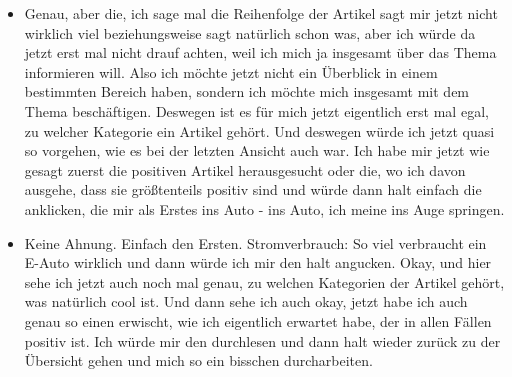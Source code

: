 {\begin{itemize}[]
              So wie ich es jetzt verstehe, dem Markt sind jetzt keine Artikel zugeordnet und hier wäre es jetzt ein bisschen schwierig für mich zu verstehen.
              Ach so, das sind ah, okay, das ist mir eben gerade auch noch nicht klar geworden, diese Zahlen, die geben nicht bestimmte Welten an oder bestimmte Zustände an.
              Also ich habe es so verstanden, dass jetzt die Null beispielsweise der Markt ist und die Eins, dann der nachfolgende Zustand.
              Aber was hier wirklich ausgesagt wird ist die Ebene, die angegeben wird.
              Also eine Ebene darunter wären dann die Artikel \flqq Stromverbrauch so viel verbraucht ein E-Auto wirklich\frqq{} und so weiter.
              Und \flqq Lohnt sich ein E-Auto bei den Strompreisen noch?\frqq{}.
              Die würden dann so wie ich es jetzt verstehe hier am Staat und an diesem unbenannten, an dieser unbenannten Kategorie hängen.
              Und dann zweite Ebene wären halt hier die beiden, also die mit der acht und der sieben und dann dritte Ebene wäre hier unten die letzte Kategorie.
        \item {} Genau, aber die, ich sage mal die Reihenfolge der Artikel sagt mir jetzt nicht wirklich viel beziehungsweise sagt natürlich schon was, aber ich würde da jetzt erst mal nicht drauf achten, weil ich mich ja insgesamt über das Thema informieren will.
              Also ich möchte jetzt nicht ein Überblick in einem bestimmten Bereich haben, sondern ich möchte mich insgesamt mit dem Thema beschäftigen.
              Deswegen ist es für mich jetzt eigentlich erst mal egal, zu welcher Kategorie ein Artikel gehört.
              Und deswegen würde ich jetzt quasi so vorgehen, wie es bei der letzten Ansicht auch war.
              Ich habe mir jetzt wie gesagt zuerst die positiven Artikel herausgesucht oder die, wo ich davon ausgehe, dass sie größtenteils positiv sind und würde dann halt einfach die anklicken, die mir als Erstes ins Auto - ins Auto, ich meine ins Auge springen.
        \item {} Keine Ahnung.
              Einfach den Ersten.
              \flqq Stromverbrauch: So viel verbraucht ein E-Auto wirklich\frqq{} und dann würde ich mir den halt angucken.
              Okay, und hier sehe ich jetzt auch noch mal genau, zu welchen Kategorien der Artikel gehört, was natürlich cool ist.
              Und dann sehe ich auch okay, jetzt habe ich auch genau so einen erwischt, wie ich eigentlich erwartet habe, der in allen Fällen positiv ist.
              Ich würde mir den durchlesen und dann halt wieder zurück zu der Übersicht gehen und mich so ein bisschen durcharbeiten.

\end{itemize}}
